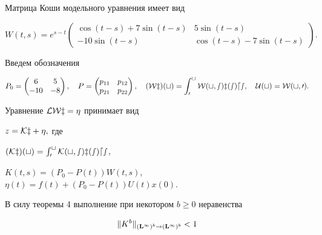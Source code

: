 \begin{pf} Матрица Коши модельного уравнения имеет вид


$$


W(t,s) = e^{s - t}


\begin{pmatrix}


\cos(t-s) + 7\sin(t-s) & 5\sin(t-s)\\


-10\sin(t-s) & \cos(t-s) - 7\sin(t-s)


\end{pmatrix}


.


$$


Введем обозначения


$$


P_0=


\begin{pmatrix}


6 & 5\\


-10 & -8


\end{pmatrix},


\quad


P=


\begin{pmatrix}


p_{11} & p_{12}\\


p_{21} & p_{22}


\end{pmatrix},


\quad


(\cal Wz)(t)=\int_0^tW(t,s)z(s)ds,\quad U(t)=W(t,0).


$$


Уравнение $\cal L\cal W z=\eta$ принимает вид


$z=\cal Kz+\eta,$ где


$(\cal K z)(t)=\int_0^tK(t,s)z(s)ds$,


$K(t,s) = (P_0-P(t))W(t,s)$, $\eta(t)=f(t)+(P_0-P(t))U(t)x(0)$.





В силу теоремы 4 выполнение при некотором $b\ge 0$ неравенства


\begin{equation}


\|K^b\|_{(\bold L^\infty )^b\to(\bold L^\infty )^b}<1


\end{equation}



\end{pf}
